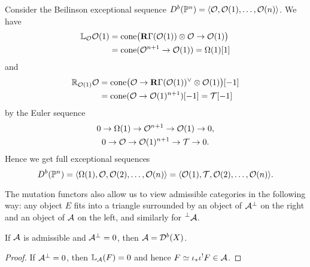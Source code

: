 \begin{example}[label=ex:tangentbundle]{}{}
    Consider the Beilinson exceptional sequence
    $D^b(\mathbb{P}^n)=\langle\mathcal{O},\mathcal{O}(1),\ldots,\mathcal{O}(n)\rangle$. We have
    \begin{align*}
        \mathbb{L}_{\mathcal{O}}\mathcal{O}(1)
            &= \operatorname{cone}\bigl(\operatorname{\mathbf{R}\Gamma}(\mathcal{O}(1))\otimes\mathcal{O}\to\mathcal{O}(1)\bigr) \\
            &= \operatorname{cone}(\mathcal{O}^{n+1}\to\mathcal{O}(1))
            = \Omega(1)[1]
    \end{align*}
    and
    \begin{align*}
        \mathbb{R}_{\mathcal{O}(1)}\mathcal{O}
            &= \operatorname{cone}\bigl(\mathcal{O}\to\operatorname{\mathbf{R}\Gamma}(\mathcal{O}(1))^\vee\otimes\mathcal{O}(1)\bigr)[-1] \\
            &= \operatorname{cone}(\mathcal{O}\to\mathcal{O}(1)^{n+1})[-1]
            = \mathcal{T}[-1]
    \end{align*}
    by the Euler sequence
    \begin{gather*}
        0\to\Omega(1)\to\mathcal{O}^{n+1}\to\mathcal{O}(1)\to0, \\
        0\to\mathcal{O}\to\mathcal{O}(1)^{n+1}\to\mathcal{T}\to0.
    \end{gather*}
    Hence we get full exceptional sequences
    \begin{equation*}
        D^b(\mathbb{P}^n)
            = \langle\Omega(1),\mathcal{O},\mathcal{O}(2),\ldots,\mathcal{O}(n)\rangle
            = \langle\mathcal{O}(1),\mathcal{T},\mathcal{O}(2),\ldots,\mathcal{O}(n)\rangle.
    \end{equation*}
\end{example}

The mutation functors also allow us to view admissible categories in the following way: any object $E$ fits into a triangle surrounded by an object of $\mathcal{A}^\perp$ on the right and an object of $\mathcal{A}$ on the left, and similarly for $\prescript{\perp}{}{\mathcal{A}}$.

\begin{corollary}{}{}
    If $\mathcal{A}$ is admissible and $\mathcal{A}^\perp=0$, then $\mathcal{A}=\mathcal{D}^b(X)$.
\end{corollary}

\begin{proof}
    If $\mathcal{A}^\perp=0$, then $\mathbb{L}_{\mathcal{A}}(F)=0$ and hence $F\simeq \iota_* \iota^! F\in \mathcal{A}$.
\end{proof}

